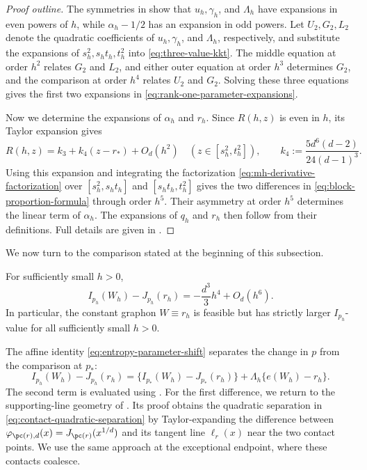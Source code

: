 \begin{proof}[Proof outline]
The symmetries in  show that
$u_h,\gamma_h$, and $\Lambda_h$ have expansions in even powers of $h$, while
$\alpha_h-1/2$ has an expansion in odd powers.  Let $U_2, G_2, L_2$
denote the quadratic coefficients of $u_h,\gamma_h$, and $\Lambda_h$,
respectively, and substitute the expansions of $s_h^2,s_ht_h,t_h^2$ into
\eqref{eq:three-value-kkt}.
The middle equation at order $h^2$ relates $G_2$ and $L_2$,
and either outer equation at order $h^3$ determines $G_2$,
and the comparison at order $h^4$ relates $U_2$ and $G_2$.
Solving these three equations gives the first two expansions in
\eqref{eq:rank-one-parameter-expansions}.

Now we determine the expansions of $\alpha_h$ and $r_h$.
Since $R(h,z)$ is even in $h$, its Taylor expansion gives
\[
  R(h,z)=k_3+k_4(z-r_*)+O_d(h^2)
  \quad (z\in[s_h^2,t_h^2]),
  \qquad
  k_4:=\frac{5d^6(d-2)}{24(d-1)^3}.
\]
Using this expansion and integrating the factorization
\eqref{eq:mh-derivative-factorization} over $[s_h^2,s_ht_h]$ and
$[s_ht_h,t_h^2]$ gives the two differences in \eqref{eq:block-proportion-formula}
through order $h^5$.  Their asymmetry at order $h^5$ determines the linear
term of $\alpha_h$.  The expansions of $q_h$ and $r_h$ then follow from
their definitions.
Full details are given in .
\end{proof}

We now turn to the comparison stated at the beginning of this subsection.

\begin{lemma}
\label{lem:constant-graphon-comparison}
For sufficiently small $h>0$,
\[
  I_{p_h}(W_h)-J_{p_h}(r_h)
  =-\frac{d^3}{3}h^4+O_d(h^6).
\]
In particular, the constant graphon
$W\equiv r_h$ is feasible but has strictly larger $I_{p_h}$-value for all
sufficiently small $h>0$.
\end{lemma}

The affine identity \eqref{eq:entropy-parameter-shift} separates the change in $p$
from the comparison at $p_*$:
\[
  I_{p_h}(W_h)-J_{p_h}(r_h)
  =\{I_{p_*}(W_h)-J_{p_*}(r_h)\}+\Lambda_h\{e(W_h)-r_h\}.
\]
The second term is evaluated using .
For the first difference, we return to the supporting-line geometry of
.  Its proof obtains the quadratic separation
in \eqref{eq:contact-quadratic-separation} by Taylor-expanding the difference between
$\varphi_{\pc(r),d}(x)=J_{\pc(r)}(x^{1/d})$ and its tangent line $\ell_r(x)$
near the two contact points.  We use the same approach at the exceptional
endpoint, where these contacts coalesce.

